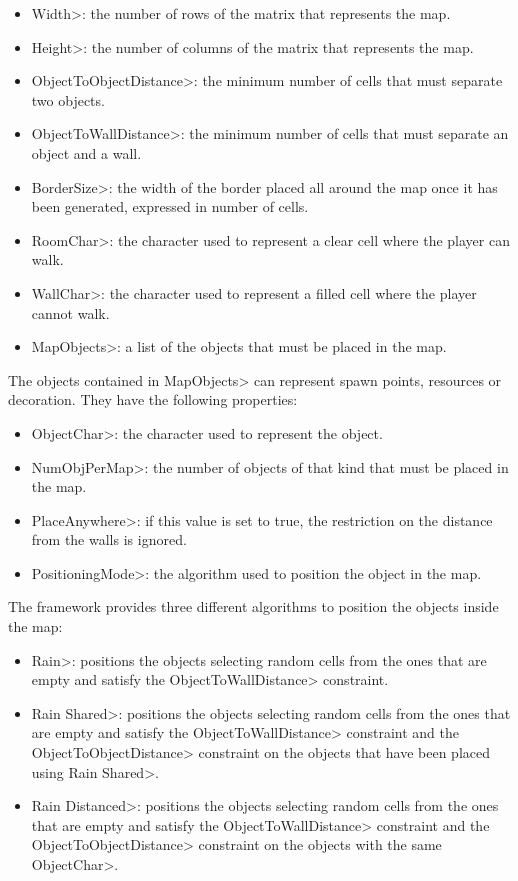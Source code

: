 \begin{itemize}
\item \<Width>: the number of rows of the matrix that represents the map.
\item \<Height>: the number of columns of the matrix that represents the map.
\item \<ObjectToObjectDistance>: the minimum number of cells that must separate two objects. 
\item \<ObjectToWallDistance>: the minimum number of cells that must separate an object and a wall.
\item \<BorderSize>: the width of the border placed all around the map once it has been generated, expressed in number of cells.
\item \<RoomChar>: the character used to represent a clear cell where the player can walk.
\item \<WallChar>: the character used to represent a filled cell where the player cannot walk.
\item \<MapObjects>: a list of the objects that must be placed in the map.
\end{itemize}

\noindent The objects contained in \<MapObjects> can represent spawn points, resources or decoration. They have the following properties:

\begin{itemize}
\item \<ObjectChar>: the character used to represent the object.
\item \<NumObjPerMap>: the number of objects of that kind that must be placed in the map.
\item \<PlaceAnywhere>: if this value is set to true, the restriction on the distance from the walls is ignored.
\item \<PositioningMode>: the algorithm used to position the object in the map.
\end{itemize}

\noindent The framework provides three different algorithms to position the objects inside the map:

\begin{itemize}
\item \<Rain>: positions the objects selecting random cells from the ones that are empty and satisfy the \<ObjectToWallDistance> constraint.
\item \<Rain Shared>: positions the objects selecting random cells from the ones that are empty and satisfy the \<ObjectToWallDistance> constraint and the \<ObjectToObjectDistance> constraint on the objects that have been placed using \<Rain Shared>.
\item \<Rain Distanced>: positions the objects selecting random cells from the ones that are empty and satisfy the \<ObjectToWallDistance> constraint and the \<ObjectToObjectDistance> constraint on the objects with the same \<ObjectChar>.
\end{itemize}

